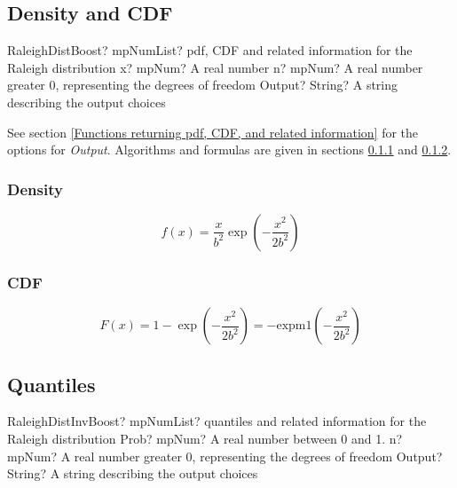 \subsection{Density and CDF}

\begin{mpFunctionsExtract}
	\mpFunctionThreeNotImplemented
	{RaleighDistBoost? mpNumList? pdf, CDF and related information for the Raleigh distribution}
	{x? mpNum? A real number}
	{n? mpNum? A real number greater 0, representing the degrees of freedom}
	{Output? String? A string describing the output choices}
\end{mpFunctionsExtract}



\vspace{0.3cm}
See section \ref{Functions returning pdf, CDF, and related information} for the options for {\itshape\sffamily Output}. Algorithms and formulas are given in sections \ref{RaleighDistributionDensity} and \ref{RaleighDistributionCDF}.


\subsubsection{Density}
\label{RaleighDistributionDensity}

\begin{equation} 
	f(x)= \frac{x}{b^2} \exp \left(- \frac{x^2}{2b^2}\right)
\end{equation}


\subsubsection{CDF}
\label{RaleighDistributionCDF}

\begin{equation} 
	F(x)= 1 - \exp \left(- \frac{x^2}{2b^2}\right)
	= -\text{expm1} \left(- \frac{x^2}{2b^2}\right)
\end{equation}



\subsection{Quantiles}

\begin{mpFunctionsExtract}
	\mpFunctionThreeNotImplemented
	{RaleighDistInvBoost? mpNumList? quantiles and related information for the Raleigh distribution}
	{Prob? mpNum? A real number between 0 and 1.}
	{n? mpNum? A real number greater 0, representing the degrees of freedom}
	{Output? String? A string describing the output choices}
\end{mpFunctionsExtract}

